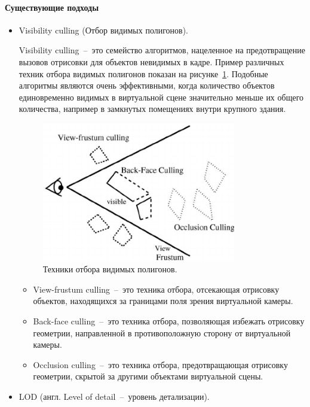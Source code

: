 ﻿\paragraph{Существующие подходы}

\begin{itemize}
    \item {
        Visibility culling (Отбор видимых полигонов).

        Visibility culling~--~это семейство алгоритмов,
        нацеленное на предотвращение вызовов отрисовки
        для объектов невидимых в кадре.%
        \cite{Cohenor2002}
        Пример различных техник отбора видимых полигонов
        показан на рисунке~\ref{figure:CullingTechniques}.
        Подобные алгоритмы являются очень эффективными,
        когда количество объектов единовременно видимых в виртуальной сцене
        значительно меньше их общего количества,
        например в замкнутых помещениях внутри крупного здания.

        \begin{figure}[ht]
            \centering
            \includegraphics[width=0.8\textwidth]
            {images/Three-types-of-visibility-culling-techniques.png}
            \caption{Техники отбора видимых полигонов.%
            \cite{Cohenor2002}}
            \label{figure:CullingTechniques}
        \end{figure}

        \begin{itemize}
            \item {
                View-frustum culling~--~это техника отбора,
                отсекающая отрисовку объектов,
                находящихся за границами поля зрения виртуальной камеры.
            }
            \item {
                Back-face culling~--~это техника отбора,
                позволяющая избежать отрисовку геометрии,
                направленной в противоположную сторону от виртуальной камеры.
            }
            \item {
                Occlusion culling~--~это техника отбора,
                предотвращающая отрисовку геометрии,
                скрытой за другими объектами виртуальной сцены.
            }
        \end{itemize}
    }
    \item {
        LOD (англ. Level of detail~--~уровень детализации).

}
\end{itemize}
